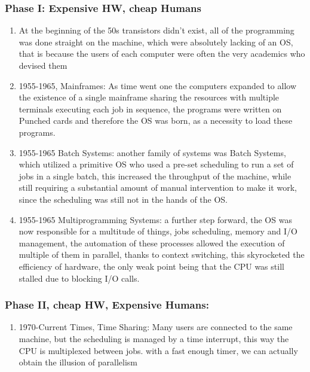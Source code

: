 \documentclass[openright, twoside]{report}
\theoremstyle{definition}
\theoremstyle{example}
\begin{document}
	\subsubsection{Phase I: Expensive HW, cheap Humans}
	\begin{enumerate}
		\item  At the beginning of the 50s
			transistors didn't exist, all of the programming was done straight
			on the machine, which were absolutely lacking of an OS, that is
			because the users of each computer were often the very academics who devised them

		\item 1955-1965, Mainframes: As time went one the computers expanded to allow
			the existence of a single mainframe sharing the resources with multiple terminals
			executing each job in sequence, the programs were written on Punched cards and therefore
			the OS was born, as a necessity to load these programs.

		\item 1955-1965 Batch Systems: another family of systems was Batch Systems, which
			utilized a primitive OS who used a pre-set scheduling to run a set of jobs in a single batch,
			this increased the throughput of the machine, while still requiring a substantial amount of
			manual intervention to make it work, since the scheduling was still not in the hands of the OS.

		\item 1955-1965 Multiprogramming Systems: a further step forward, the OS was now
			responsible for a multitude of things, jobs scheduling, memory and I/O management, the automation
			of these processes allowed the execution of multiple of them in parallel, thanks to context
			switching, this skyrocketed the efficiency of hardware, the only weak point being that
			the CPU was still stalled due to blocking I/O calls.
	\end{enumerate}
	\subsubsection{Phase II, cheap HW, Expensive Humans:}
	\begin{enumerate}
		\label{par:parallel}
		\item 1970-Current Times, Time Sharing: Many users are connected to the same machine, but
			the scheduling is managed by a time interrupt, this way the CPU is multiplexed between jobs.
			with a fast enough timer, we can actually obtain the illusion of parallelism
	\end{enumerate}
\end{document}
